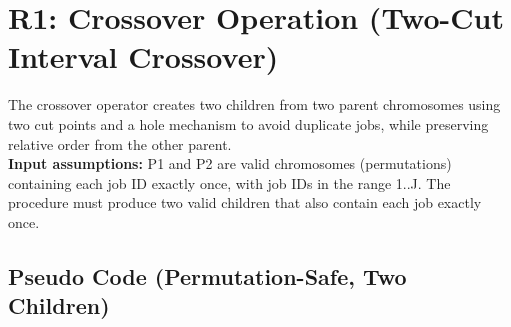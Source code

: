 \documentclass[10pt,twocolumn]{article}
\begin{document}
\section{R1: Crossover Operation (Two-Cut Interval Crossover)}

The crossover operator creates two children from two parent chromosomes using two cut points and a hole mechanism to avoid duplicate jobs, while preserving relative order from the other parent.
\\\textbf{Input assumptions:}
P1 and P2 are valid chromosomes (permutations) containing each job ID exactly once, with job IDs in the range 1..J.
The procedure must produce two valid children that also contain each job exactly once.

\subsection*{Pseudo Code (Permutation-Safe, Two Children)}
\end{document}
